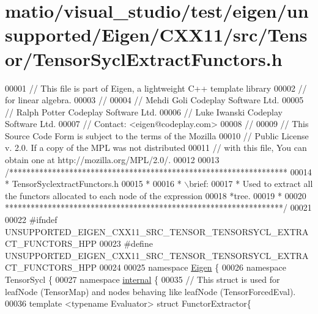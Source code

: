 \hypertarget{matio_2visual__studio_2test_2eigen_2unsupported_2_eigen_2_c_x_x11_2src_2_tensor_2_tensor_sycl_extract_functors_8h_source}{}\section{matio/visual\+\_\+studio/test/eigen/unsupported/\+Eigen/\+C\+X\+X11/src/\+Tensor/\+Tensor\+Sycl\+Extract\+Functors.h}
\label{matio_2visual__studio_2test_2eigen_2unsupported_2_eigen_2_c_x_x11_2src_2_tensor_2_tensor_sycl_extract_functors_8h_source}

\begin{DoxyCode}
00001 \textcolor{comment}{// This file is part of Eigen, a lightweight C++ template library}
00002 \textcolor{comment}{// for linear algebra.}
00003 \textcolor{comment}{//}
00004 \textcolor{comment}{// Mehdi Goli    Codeplay Software Ltd.}
00005 \textcolor{comment}{// Ralph Potter  Codeplay Software Ltd.}
00006 \textcolor{comment}{// Luke Iwanski  Codeplay Software Ltd.}
00007 \textcolor{comment}{// Contact: <eigen@codeplay.com>}
00008 \textcolor{comment}{//}
00009 \textcolor{comment}{// This Source Code Form is subject to the terms of the Mozilla}
00010 \textcolor{comment}{// Public License v. 2.0. If a copy of the MPL was not distributed}
00011 \textcolor{comment}{// with this file, You can obtain one at http://mozilla.org/MPL/2.0/.}
00012 
00013 \textcolor{comment}{/*****************************************************************}
00014 \textcolor{comment}{ * TensorSyclextractFunctors.h}
00015 \textcolor{comment}{ *}
00016 \textcolor{comment}{ * \(\backslash\)brief:}
00017 \textcolor{comment}{ *  Used to extract all the functors allocated to each node of the expression}
00018 \textcolor{comment}{*tree.}
00019 \textcolor{comment}{ *}
00020 \textcolor{comment}{*****************************************************************/}
00021 
00022 \textcolor{preprocessor}{#ifndef UNSUPPORTED\_EIGEN\_CXX11\_SRC\_TENSOR\_TENSORSYCL\_EXTRACT\_FUNCTORS\_HPP}
00023 \textcolor{preprocessor}{#define UNSUPPORTED\_EIGEN\_CXX11\_SRC\_TENSOR\_TENSORSYCL\_EXTRACT\_FUNCTORS\_HPP}
00024 
00025 \textcolor{keyword}{namespace }\hyperlink{namespace_eigen}{Eigen} \{
00026 \textcolor{keyword}{namespace }TensorSycl \{
00027 \textcolor{keyword}{namespace }\hyperlink{namespaceinternal}{internal} \{
00035 \textcolor{comment}{// This struct is used for leafNode (TensorMap) and nodes behaving like leafNode (TensorForcedEval).}
00036 \textcolor{keyword}{template} <\textcolor{keyword}{typename} Evaluator> \textcolor{keyword}{struct }FunctorExtractor\{

\end{DoxyCode}
